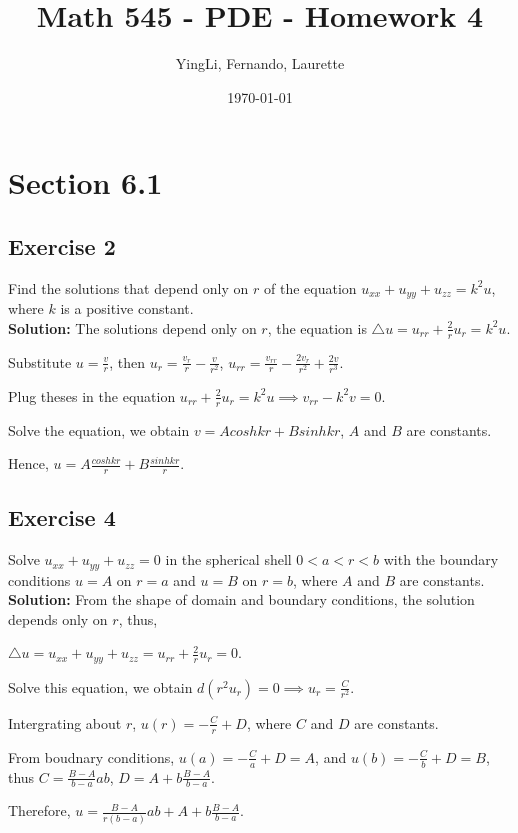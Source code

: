 \documentclass[12pt]{article}%
\begin{document}
\title{Math 545 - PDE - Homework 4}
\author{YingLi, Fernando, Laurette }
\date{\today}
\maketitle

\section*{Section 6.1}
\subsection*{Exercise 2} Find the solutions that depend only on $r$ of the equation $u_{xx}+u_{yy}+u_{zz}=k^2u$, where $k$ is a positive constant.\\
\textbf{Solution:} 
The solutions depend only on $r$, the equation is $\triangle u =u_{rr} +\frac{2}{r}u_{r}=k^2u$.

Substitute $u=\frac{v}{r}$, then $u_{r}=\frac{v_{r}}{r}-\frac{v}{r^2}$, $u_{rr}=\frac{v_{rr}}{r}-\frac{2v_{r}}{r^2}+\frac{2v}{r^3}$.

Plug theses in the equation $u_{rr}+\frac{2}{r}u_{r}=k^2u \implies v_{rr}-k^2v=0.$

Solve the equation, we obtain $v=Acosh kr+Bsinh kr$, $A$ and $B$ are constants. 

Hence, $u=A\frac{cosh kr}{r}+B\frac{sinh kr}{r}$.

\subsection*{Exercise 4} Solve $u_{xx}+u_{yy}+u_{zz}=0$ in the spherical shell $0<a<r<b$ with the boundary conditions $u=A$ on $r=a$ and $u=B$ on $r=b$,
    where $A$ and $B$ are constants.\\
    \textbf{Solution:}
From the shape of domain and boundary conditions, the solution depends only on $r$, thus,

$\triangle u = u_{xx}+u_{yy}+u_{zz}= u_{rr} +\frac{2}{r}u_{r}=0$.

Solve this equation, we obtain $d(r^2u_{r})=0 \implies u_{r}=\frac{C}{r^2}$.

Intergrating about $r$, $u(r)=-\frac{C}{r}+D$, where $C$ and $D$ are constants.

From boudnary conditions, $u(a)=-\frac{C}{a}+D=A$, and $u(b)=-\frac{C}{b}+D=B$, thus $C=\frac{B-A}{b-a}ab$, $D=A+b\frac{B-A}{b-a}$.

Therefore, $u=\frac{B-A}{r(b-a)}ab+A+b\frac{B-A}{b-a}.$
\end{document}
